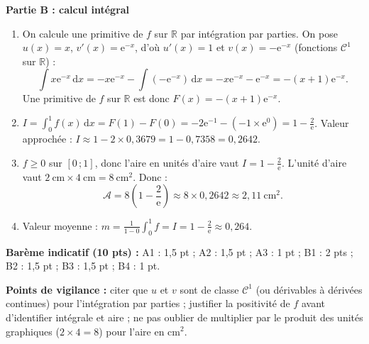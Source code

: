 \documentclass[11pt]{article}
\begin{document}
\begin{corrige}[Exercice 8 — Type Probatoire : étude de $f(x)=x\mathrm{e}^{-x}$]
\textbf{Partie B : calcul intégral}
\begin{enumerate}
\item On calcule une primitive de $f$ sur $\mathbb{R}$ par intégration par parties.
On pose $u(x)=x$, $v'(x)=\mathrm{e}^{-x}$, d'où $u'(x)=1$ et $v(x)=-\mathrm{e}^{-x}$ (fonctions $\mathcal{C}^1$ sur $\mathbb{R}$) :
\[ \int x\mathrm{e}^{-x}\,\mathrm{d}x = -x\mathrm{e}^{-x} - \int (-\mathrm{e}^{-x})\,\mathrm{d}x = -x\mathrm{e}^{-x} - \mathrm{e}^{-x} = -(x+1)\mathrm{e}^{-x}. \]
Une primitive de $f$ sur $\mathbb{R}$ est donc $F(x)=-(x+1)\mathrm{e}^{-x}$.
\item $\displaystyle I = \int_0^1 f(x)\,\mathrm{d}x = F(1)-F(0) = -2\mathrm{e}^{-1} - (-1\times\mathrm{e}^{0}) = 1 - \frac{2}{\mathrm{e}}$.
Valeur approchée : $I \approx 1 - 2\times 0{,}3679 = 1 - 0{,}7358 = 0{,}2642$.
\item $f\geq 0$ sur $[0\,;1]$, donc l'aire en unités d'aire vaut $I = 1-\frac{2}{\mathrm{e}}$.
L'unité d'aire vaut $2\ \mathrm{cm}\times 4\ \mathrm{cm} = 8\ \mathrm{cm}^2$. Donc :
\[ \mathcal{A} = 8\left(1-\frac{2}{\mathrm{e}}\right) \approx 8\times 0{,}2642 \approx 2{,}11\ \mathrm{cm}^2. \]
\item Valeur moyenne : $\displaystyle m = \frac{1}{1-0}\int_0^1 f = I = 1-\frac{2}{\mathrm{e}} \approx 0{,}264$.
\end{enumerate}
\textbf{Barème indicatif (10 pts) :} A1 : 1,5 pt ; A2 : 1,5 pt ; A3 : 1 pt ; B1 : 2 pts ; B2 : 1,5 pt ; B3 : 1,5 pt ; B4 : 1 pt.

\textbf{Points de vigilance :} citer que $u$ et $v$ sont de classe $\mathcal{C}^1$ (ou dérivables à dérivées continues) pour l'intégration par parties ; justifier la positivité de $f$ avant d'identifier intégrale et aire ; ne pas oublier de multiplier par le produit des unités graphiques ($2\times 4 = 8$) pour l'aire en $\mathrm{cm}^2$.
\end{corrige}
\end{document}
